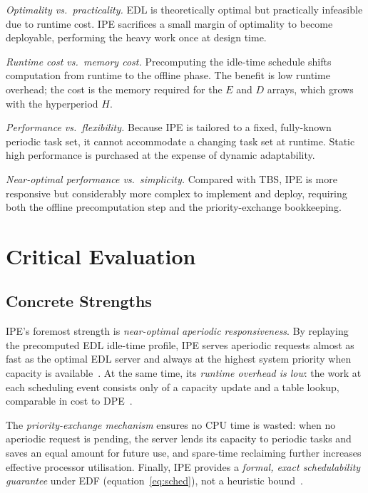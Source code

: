 \documentclass[conference]{IEEEtran}
\begin{document}
\textit{Optimality vs.\ practicality.} EDL is theoretically
optimal but practically infeasible due to runtime cost.
IPE sacrifices a small margin of optimality to become
deployable, performing the heavy work once at design time.

\textit{Runtime cost vs.\ memory cost.} Precomputing the
idle-time schedule shifts computation from runtime to the
offline phase. The benefit is low runtime overhead; the cost
is the memory required for the $E$ and $D$ arrays, which
grows with the hyperperiod $H$.

\textit{Performance vs.\ flexibility.} Because IPE is
tailored to a fixed, fully-known periodic task set, it cannot
accommodate a changing task set at runtime. Static high
performance is purchased at the expense of dynamic
adaptability.

\textit{Near-optimal performance vs.\ simplicity.} Compared
with TBS, IPE is more responsive but considerably more
complex to implement and deploy, requiring both the offline
precomputation step and the priority-exchange bookkeeping.

\section{Critical Evaluation}
\label{sec:critical}

\subsection{Concrete Strengths}

IPE's foremost strength is \emph{near-optimal aperiodic
responsiveness}. By replaying the precomputed EDL idle-time
profile, IPE serves aperiodic requests almost as fast as the
optimal EDL server and always at the highest system priority
when capacity is available~\cite{buttazzo2011}. At the same
time, its \emph{runtime overhead is low}: the work at each
scheduling event consists only of a capacity update and a
table lookup, comparable in cost to DPE~\cite{spuri1996}.

The \emph{priority-exchange mechanism} ensures no CPU time is
wasted: when no aperiodic request is pending, the server lends
its capacity to periodic tasks and saves an equal amount for
future use, and spare-time reclaiming further increases
effective processor utilisation. Finally, IPE provides a
\emph{formal, exact schedulability guarantee} under EDF
(equation~\eqref{eq:sched}), not a heuristic
bound~\cite{spuri1996}.
\end{document}
